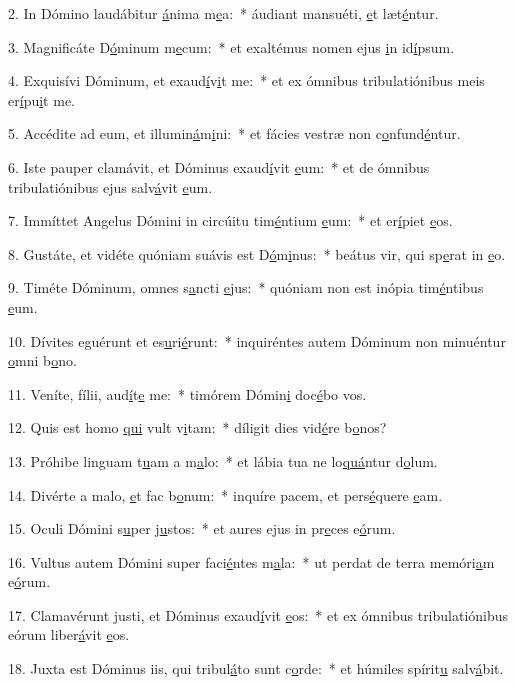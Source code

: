 2. In Dómino laudábitur \uline{á}nima m\uline{e}a:~* áudiant mansuéti, \uline{e}t læt\uline{é}ntur.\par 
3. Magnificáte D\uline{ó}minum m\uline{e}cum:~* et exaltémus nomen ejus \uline{i}n id\uline{í}psum.\par 
4. Exquisívi Dóminum, et exaud\uline{í}v\uline{i}t me:~* et ex ómnibus tribulatiónibus meis er\uline{í}pu\uline{i}t me.\par 
5. Accédite ad eum, et illumin\uline{á}m\uline{i}ni:~* et fácies vestræ non c\uline{o}nfund\uline{é}ntur.\par 
6. Iste pauper clamávit, et Dóminus exaud\uline{í}vit \uline{e}um:~* et de ómnibus tribulatiónibus ejus salv\uline{á}vit \uline{e}um.\par 
7. Immíttet Angelus Dómini in circúitu tim\uline{é}ntium \uline{e}um:~* et er\uline{í}piet \uline{e}os.\par 
8. Gustáte, et vidéte quóniam suávis est D\uline{ó}m\uline{i}nus:~* beátus vir, qui sp\uline{e}rat in \uline{e}o.\par 
9. Timéte Dóminum, omnes s\uline{a}ncti \uline{e}jus:~* quóniam non est inópia tim\uline{é}ntibus \uline{e}um.\par 
10. Dívites eguérunt et es\uline{u}ri\uline{é}runt:~* inquiréntes autem Dóminum non minuéntur \uline{o}mni b\uline{o}no.\par 
11. Veníte, fílii, aud\uline{í}t\uline{e} me:~* timórem Dómin\uline{i} doc\uline{é}bo vos.\par 
12. Quis est homo \uline{qui} vult v\uline{i}tam:~* díligit dies vid\uline{é}re b\uline{o}nos?\par 
13. Próhibe linguam t\uline{u}am a m\uline{a}lo:~* et lábia tua ne lo\uline{quá}ntur d\uline{o}lum.\par 
14. Divérte a malo, \uline{e}t fac b\uline{o}num:~* inquíre pacem, et pers\uline{é}quere \uline{e}am.\par 
15. Oculi Dómini s\uline{u}per j\uline{u}stos:~* et aures ejus in pr\uline{e}ces e\uline{ó}rum.\par 
16. Vultus autem Dómini super faci\uline{é}ntes m\uline{a}la:~* ut perdat de terra memóri\uline{a}m e\uline{ó}rum.\par 
17. Clamavérunt justi, et Dóminus exaud\uline{í}vit \uline{e}os:~* et ex ómnibus tribulatiónibus eórum liber\uline{á}vit \uline{e}os.\par 
18. Juxta est Dóminus iis, qui tribul\uline{á}to sunt c\uline{o}rde:~* et húmiles spírit\uline{u} salv\uline{á}bit.\par 
